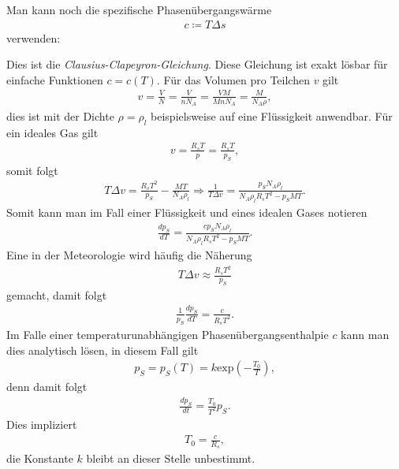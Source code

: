 \documentclass{book}
\renewcommand{\exp}{\text{exp}}
\begin{document}
%
Man kann noch die spezifische Phasenübergangswärme
%
\begin{eqnarray}
c \coloneqq T\Delta s
\end{eqnarray}
%
verwenden:
%
\begin{center}
\end{center}
%
Dies ist die \textit{Clausius-Clapeyron-Gleichung}. Diese Gleichung ist exakt lösbar für einfache Funktionen $c = c\left(T\right)$. Für das Volumen pro Teilchen $v$ gilt
%
\begin{eqnarray}
v = \frac{V}{N} = \frac{V}{nN_A} = \frac{VM}{MnN_A} = \frac{M}{N_A\rho}, 
\end{eqnarray}
%
dies ist mit der Dichte $\rho = \rho_l$ beispielsweise auf eine Flüssigkeit anwendbar. Für ein ideales Gas gilt
%
\begin{eqnarray}
v = \frac{R_sT}{p} = \frac{R_sT}{p_S}, 
\end{eqnarray}
%
somit folgt
%
\begin{eqnarray}
T\Delta v = \frac{R_sT^2}{p_S} - \frac{MT}{N_A\rho_l}\Rightarrow\frac{1}{T\Delta v} = \frac{p_SN_A\rho_l}{N_A\rho_lR_sT^2 - p_SMT}.
\end{eqnarray}
%
Somit kann man im Fall einer Flüssigkeit und eines idealen Gases notieren
%
\begin{eqnarray}
\frac{dp_S}{dT} = \frac{cp_SN_A\rho_l}{N_A\rho_lR_sT^2 - p_SMT}.
\end{eqnarray}
%
Eine in der Meteorologie wird häufig die Näherung
%
\begin{eqnarray}
T\Delta v\approx\frac{R_sT^2}{p_S}
\end{eqnarray}
%
gemacht, damit folgt
%
\begin{eqnarray}
\frac{1}{p_S}\frac{dp_S}{dT} = \frac{c}{R_sT^2}.\label{eq:clausius_clapeyron_vereinfacht}
\end{eqnarray}
%
Im Falle einer temperaturunabhängigen Phasenübergangsenthalpie $c$ kann man dies analytisch lösen, in diesem Fall gilt
%
\begin{eqnarray}
p_S = p_S\left(T\right) = k\exp\left(-\frac{T_0}{T}\right), 
\end{eqnarray}
%
denn damit folgt
%
\begin{eqnarray}
\frac{dp_S}{dt} = \frac{T_0}{T^2}p_S.
\end{eqnarray}
%
Dies impliziert
%
\begin{eqnarray}
T_0 = \frac{c}{R_s}, 
\end{eqnarray}
%
die Konstante $k$ bleibt an dieser Stelle unbestimmt.
\end{document}
